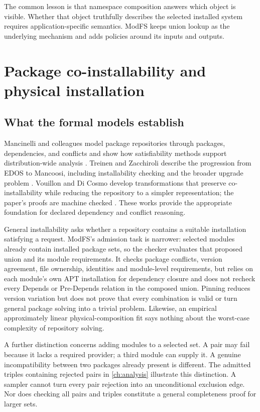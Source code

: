 The common lesson is that namespace composition answers which object is visible. Whether that object truthfully describes the selected installed system requires application-specific semantics. ModFS keeps union lookup as the underlying mechanism and adds policies around its inputs and outputs.

\section{Package co-installability and physical installation}

\subsection{What the formal models establish}

Mancinelli and colleagues model package repositories through packages, dependencies, and conflicts and show how satisfiability methods support distribution-wide analysis \autocite{mancinelli2006managing}. Treinen and Zacchiroli describe the progression from EDOS to Mancoosi, including installability checking and the broader upgrade problem \autocite{treinen2008solving}. Vouillon and Di Cosmo develop transformations that preserve co-installability while reducing the repository to a simpler representation; the paper's proofs are machine checked \autocite{vouillon2013coinstallability}. These works provide the appropriate foundation for declared dependency and conflict reasoning.

General installability asks whether a repository contains a suitable installation satisfying a request. ModFS's admission task is narrower: selected modules already contain installed package sets, so the checker evaluates that proposed union and its module requirements. It checks package conflicts, version agreement, file ownership, identities and module-level requirements, but relies on each module's own APT installation for dependency closure and does not recheck every Depends or Pre-Depends relation in the composed union. Pinning reduces version variation but does not prove that every combination is valid or turn general package solving into a trivial problem. Likewise, an empirical approximately linear physical-composition fit says nothing about the worst-case complexity of repository solving.

A further distinction concerns adding modules to a selected set. A pair may fail because it lacks a required provider; a third module can supply it. A genuine incompatibility between two packages already present is different. The admitted triples containing rejected pairs in \cref{ch:analysis} illustrate this distinction. A sampler cannot turn every pair rejection into an unconditional exclusion edge. Nor does checking all pairs and triples constitute a general completeness proof for larger sets.

